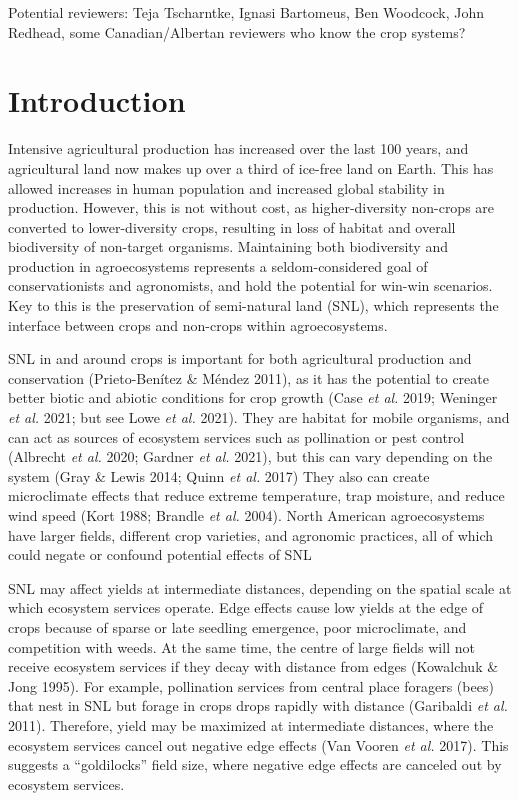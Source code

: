 \documentclass[]{elsarticle} %
\begin{document}
Potential reviewers: Teja Tscharntke, Ignasi Bartomeus, Ben Woodcock, John Redhead, some Canadian/Albertan reviewers who know the crop systems?

\newpage
\doublespacing

\hypertarget{introduction}{%
\section{Introduction}\label{introduction}}

Intensive agricultural production has increased over the last 100 years, and agricultural land now makes up over a third of ice-free land on Earth.
This has allowed increases in human population and increased global stability in production.
However, this is not without cost, as higher-diversity non-crops are converted to lower-diversity crops, resulting in loss of habitat and overall biodiversity of non-target organisms.
Maintaining both biodiversity and production in agroecosystems represents a seldom-considered goal of conservationists and agronomists, and hold the potential for win-win scenarios.
Key to this is the preservation of semi-natural land (SNL), which represents the interface between crops and non-crops within agroecosystems.

SNL in and around crops is important for both agricultural production and conservation (Prieto-Benítez \& Méndez 2011), as it has the potential to create better biotic and abiotic conditions for crop growth (Case \emph{et al.} 2019; Weninger \emph{et al.} 2021; but see Lowe \emph{et al.} 2021).
They are habitat for mobile organisms, and can act as sources of ecosystem services such as pollination or pest control (Albrecht \emph{et al.} 2020; Gardner \emph{et al.} 2021), but this can vary depending on the system (Gray \& Lewis 2014; Quinn \emph{et al.} 2017)
They also can create microclimate effects that reduce extreme temperature, trap moisture, and reduce wind speed (Kort 1988; Brandle \emph{et al.} 2004).
North American agroecosystems have larger fields, different crop varieties, and agronomic practices, all of which could negate or confound potential effects of SNL

SNL may affect yields at intermediate distances, depending on the spatial scale at which ecosystem services operate.
Edge effects cause low yields at the edge of crops because of sparse or late seedling emergence, poor microclimate, and competition with weeds.
At the same time, the centre of large fields will not receive ecosystem services if they decay with distance from edges (Kowalchuk \& Jong 1995).
For example, pollination services from central place foragers (bees) that nest in SNL but forage in crops drops rapidly with distance (Garibaldi \emph{et al.} 2011).
Therefore, yield may be maximized at intermediate distances, where the ecosystem services cancel out negative edge effects (Van Vooren \emph{et al.} 2017).
This suggests a ``goldilocks'' field size, where negative edge effects are canceled out by ecosystem services.
\end{document}
